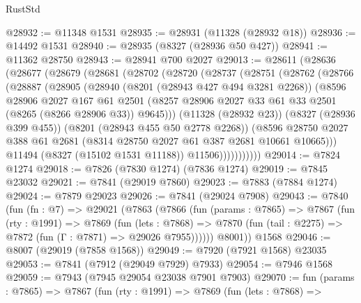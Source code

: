 \begin{lexlean}{RustStd}
\begin{coremodule}
{\begin{coremodule}
{{{{{{{{{{{{{{{{{{{{{{{{{{{{{{{{{{{{{{{{{{{{{{{{{{{{{{@28932 := @11348 @1531
@28935 := @28931 (@11328 (@28932 @18))
@28936 := @14492 @1531
@28940 := @28935 (@8327 (@28936 @50 @427))
@28941 := @11362 @28750
@28943 := @28941 @700 @2027
@29013 := @28611
    (@28636
      (@28677
        (@28679
          (@28681
            (@28702
              (@28720
                (@28737
                  (@28751
                    (@28762
                      (@28766
                        (@28887
                          (@28905
                            (@28940
                              (@8201 (@28943 @427 @494 @3281 @2268))
                              (@8596
                                @28906
                                @2027
                                @167
                                @61
                                @2501
                                (@8257
                                  @28906
                                  @2027
                                  @33
                                  @61
                                  @33
                                  @2501
                                  (@8265 (@8266 @28906 @33))
                                  @9645)))
                            (@11328 (@28932 @23))
                            (@8327 (@28936 @399 @455))
                            (@8201 (@28943 @455 @50 @2778 @2268))
                            (@8596
                              @28750
                              @2027
                              @388
                              @61
                              @2681
                              (@8314 @28750 @2027 @61 @387 @2681 @10661 @10665)))
                          @11494
                          (@8327 (@15102 @1531 @11188))
                          @11506)))))))))))
@29014 := @7824 @1274
@29018 := @7826 (@7830 @1274) (@7836 @1274)
@29019 := @7845 @23032
@29021 := @7841 (@29019 @7860)
@29023 := @7883 (@7884 @1274)
@29024 := @7879 @29023
@29026 := @7841 (@29024 @7908)
@29043 := @7840
    (fun (fn : @7) =>
    @29021
      (@7863
        (@7866
          (fun (params : @7865) =>
          @7867
            (fun (rty : @1991) =>
            @7869
              (fun (lets : @7868) =>
              @7870 (fun (tail : @2275) => @7872 (fun (Γ : @7871) => @29026 @7955))))))
        @8001))
    @1568
@29046 := @8007 (@29019 (@7858 @1568))
@29049 := @7920 (@7921 @1568) @23035
@29053 := @7841 (@7912 (@29049 @7929) @7933)
@29054 := @7946 @1568
@29059 := @7943 (@7945 @29054 @23038 @7901 @7903)
@29070 := fun (params : @7865) =>
  @7867
    (fun (rty : @1991) =>
    @7869
      (fun (lets : @7868) =>
}}}}}}}}}}}}}}}}}}}}}}}}}}}}}}}}}}}}}}}}}}}}}}}}}}}}}}
\end{coremodule}}
\end{coremodule}
\end{lexlean}
